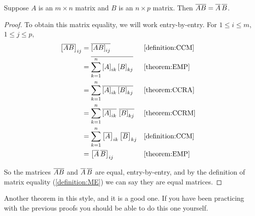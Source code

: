 \documentclass{ximera}
\begin{document}
\begin{theorem}
\label{theorem:MMCC}

Suppose $A$ is an $m\times n$ matrix and $B$ is an $n\times p$ matrix.  Then $\overline{AB}=\overline{A}\,\overline{B}$.

\begin{proof}
  To obtain this matrix equality, we will work entry-by-entry.  For $1\leq i\leq m$, $1\leq j\leq p$,
  \begin{align*}
    \left\lbrack\overline{AB}\right\rbrack_{ij}
    &=\overline{\left\lbrack AB\right\rbrack_{ij}}
    &&\ref{definition:CCM}\\
    &=\overline{\sum_{k=1}^{n}\left\lbrack A\right\rbrack_{ik}\left\lbrack B\right\rbrack_{kj}}
    &&\ref{theorem:EMP}\\
    &=\sum_{k=1}^{n}\overline{\left\lbrack A\right\rbrack_{ik}\left\lbrack B\right\rbrack_{kj}}
    &&\ref{theorem:CCRA}\\
    &=\sum_{k=1}^{n}\overline{\left\lbrack A\right\rbrack_{ik}}\,\,\overline{\left\lbrack B\right\rbrack_{kj}}
    &&\ref{theorem:CCRM}\\
    &=\sum_{k=1}^{n}\left\lbrack\overline{A}\right\rbrack_{ik}\left\lbrack\overline{B}\right\rbrack_{kj}
    &&\ref{definition:CCM}\\
    &=\left\lbrack\overline{A}\,\overline{B}\right\rbrack_{ij}
    &&\ref{theorem:EMP}
  \end{align*}

  So the matrices $\overline{AB}$ and $\overline{A}\,\overline{B}$
  are equal, entry-by-entry, and by the definition of matrix equality
  (\ref{definition:ME}) we can say they are equal matrices.
  
\end{proof}
\end{theorem}

Another theorem in this style, and it is a good one.  If you have been practicing with the previous proofs you should be able to do this one yourself.
\end{document}
